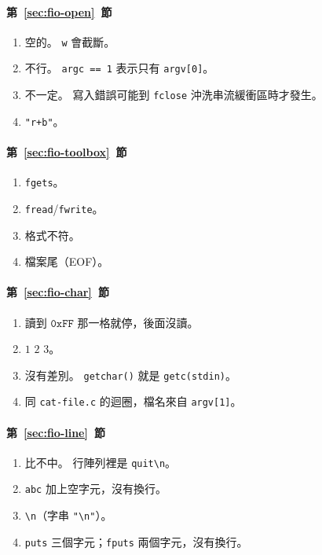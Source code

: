 \paragraph{第~\ref{sec:fio-open}~節}
\begin{enumerate}
\item 空的。 \texttt{w} 會截斷。
\item 不行。 \texttt{argc == 1} 表示只有 \texttt{argv[0]}。
\item 不一定。 寫入錯誤可能到 \texttt{fclose} 沖洗串流緩衝區時才發生。
\item \texttt{"r+b"}。
\end{enumerate}

\paragraph{第~\ref{sec:fio-toolbox}~節}
\begin{enumerate}
\item \texttt{fgets}。
\item \texttt{fread}/\texttt{fwrite}。
\item 格式不符。
\item 檔案尾（EOF）。
\end{enumerate}

\paragraph{第~\ref{sec:fio-char}~節}
\begin{enumerate}
\item 讀到 $\mathtt{0xFF}$ 那一格就停，後面沒讀。
\item $1$ $2$ $3$。
\item 沒有差別。 \texttt{getchar()} 就是 \texttt{getc(stdin)}。
\item 同 \texttt{cat-file.c} 的迴圈，檔名來自 \texttt{argv[1]}。
\end{enumerate}

\paragraph{第~\ref{sec:fio-line}~節}
\begin{enumerate}
\item 比不中。 行陣列裡是 \texttt{quit\textbackslash n}。
\item \texttt{abc} 加上空字元，沒有換行。
\item \texttt{\textbackslash n}（字串 \texttt{"\textbackslash n"}）。
\item \texttt{puts} 三個字元；\texttt{fputs} 兩個字元，沒有換行。
\end{enumerate}


